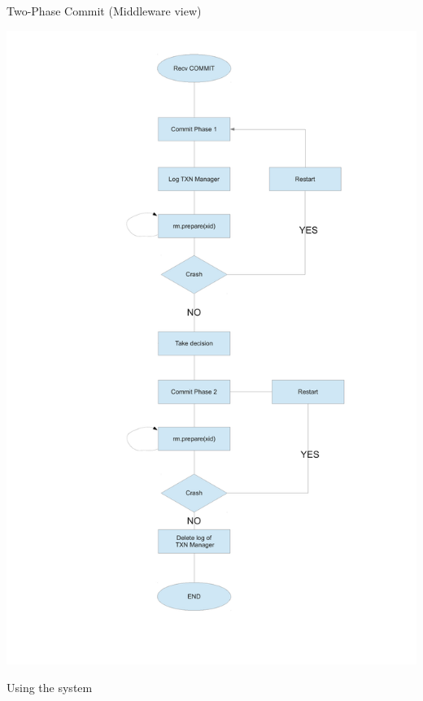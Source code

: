\documentclass{beamer}
\begin{document}
\begin{frame}{Two-Phase Commit (Middleware view)}

  \begin{center}
    \includegraphics[scale=0.22]{2pc-mw.pdf}
  \end{center}

\end{frame}




\begin{frame}
  \Huge{Using the system}
\end{frame}
\end{document}

